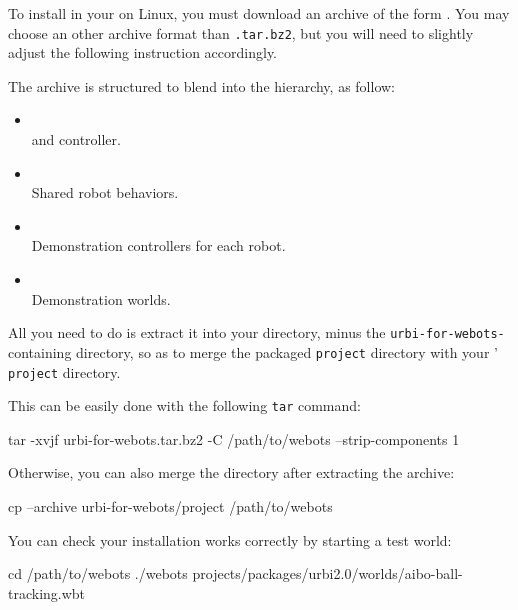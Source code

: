 To install \uwebots{} in your \webots{} on Linux, you must download an
archive of the form
.
You may choose an other archive format than \texttt{.tar.bz2}, but you
will need to slightly adjust the following instruction accordingly.

The archive is structured to blend into the \webots hierarchy, as
follow:

\begin{itemize}
\item
  \\
  \usdk and \webots{} controller.
\item {}\\ Shared
  \us{} robot behaviors.
\item {}\\
  Demonstration controllers for each robot.
\item {}\\ Demonstration
  worlds.
\end{itemize}

All you need to do is extract it into your \webots directory, minus the
\texttt{urbi-for-webots-} containing directory, so as to
merge the packaged \texttt{project} directory with your \webots{}'
\texttt{project} directory.

This can be easily done with the following \texttt{tar} command:

\begin{shell}
tar -xvjf urbi-for-webots.tar.bz2 -C /path/to/webots --strip-components 1
\end{shell}

Otherwise, you can also merge the directory after extracting the archive:

\begin{shell}
cp --archive urbi-for-webots/project /path/to/webots
\end{shell}

You can check your installation works correctly by starting a test world:

\begin{shell}
cd /path/to/webots
./webots projects/packages/urbi2.0/worlds/aibo-ball-tracking.wbt
\end{shell}

